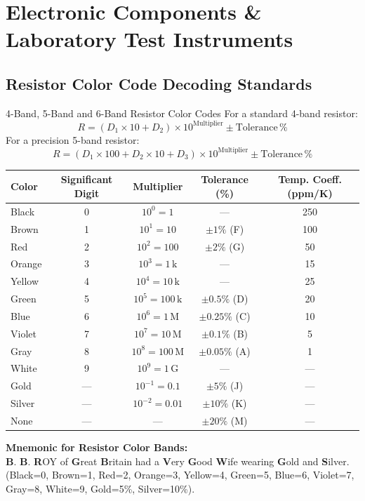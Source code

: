 \chapter{Electronic Components \& Laboratory Test Instruments}

\section{Resistor Color Code Decoding Standards}
\begin{formulabox}{4-Band, 5-Band and 6-Band Resistor Color Codes}
For a standard 4-band resistor:
\[ R = (D_1 \times 10 + D_2) \times 10^{\text{Multiplier}} \pm \text{Tolerance}\,\% \]
For a precision 5-band resistor:
\[ R = (D_1 \times 100 + D_2 \times 10 + D_3) \times 10^{\text{Multiplier}} \pm \text{Tolerance}\,\% \]
\begin{center}
\begin{tabular}{lcccc}
\toprule
\textbf{Color} & \textbf{Significant Digit} & \textbf{Multiplier} & \textbf{Tolerance (\%)} & \textbf{Temp. Coeff. (ppm/K)} \\
\midrule
Black & 0 & $10^0 = 1$ & --- & 250 \\
Brown & 1 & $10^1 = 10$ & $\pm 1\%$ (F) & 100 \\
Red & 2 & $10^2 = 100$ & $\pm 2\%$ (G) & 50 \\
Orange & 3 & $10^3 = 1\,\mathrm{k}$ & --- & 15 \\
Yellow & 4 & $10^4 = 10\,\mathrm{k}$ & --- & 25 \\
Green & 5 & $10^5 = 100\,\mathrm{k}$ & $\pm 0.5\%$ (D) & 20 \\
Blue & 6 & $10^6 = 1\,\mathrm{M}$ & $\pm 0.25\%$ (C) & 10 \\
Violet & 7 & $10^7 = 10\,\mathrm{M}$ & $\pm 0.1\%$ (B) & 5 \\
Gray & 8 & $10^8 = 100\,\mathrm{M}$ & $\pm 0.05\%$ (A) & 1 \\
White & 9 & $10^9 = 1\,\mathrm{G}$ & --- & --- \\
Gold & --- & $10^{-1} = 0.1$ & $\pm 5\%$ (J) & --- \\
Silver & --- & $10^{-2} = 0.01$ & $\pm 10\%$ (K) & --- \\
None & --- & --- & $\pm 20\%$ (M) & --- \\
\bottomrule
\end{tabular}
\end{center}
\end{formulabox}

\begin{memorytip}
\textbf{Mnemonic for Resistor Color Bands:}\\
\textbf{B}. \textbf{B}. \textbf{R}OY of \textbf{G}reat \textbf{B}ritain had a \textbf{V}ery \textbf{G}ood \textbf{W}ife wearing \textbf{G}old and \textbf{S}ilver.\\
(Black=0, Brown=1, Red=2, Orange=3, Yellow=4, Green=5, Blue=6, Violet=7, Gray=8, White=9, Gold=5\%, Silver=10\%).
\end{memorytip}

